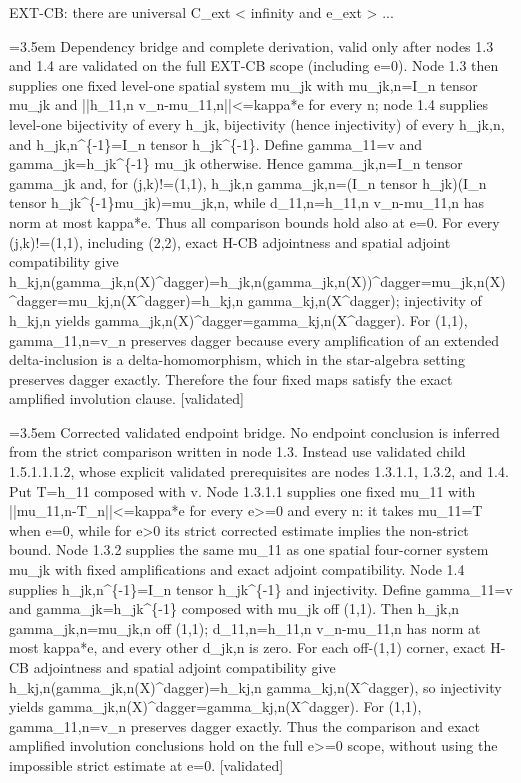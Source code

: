 \documentclass{article}
\newcommand{\step}[1]{\par\noindent\hangindent=3.5em\hangafter=1%
  \makebox[3.5em][l]{\textbf{#1.}}}
\newcommand{\steptag}[1]{\hfill{\small\textsf{[#1]}}}
\begin{document}
\begin{proofbox}{EXT-CB: there are universal C\_ext < infinity and e\_ext > ...}
\step{1.5.1.1} Dependency bridge and complete derivation, valid only after nodes 1.3 and 1.4 are validated on the full EXT-CB scope (including e=0). Node 1.3 then supplies one fixed level-one spatial system mu\_jk with mu\_jk,n=I\_n tensor mu\_jk and ||h\_11,n v\_n-mu\_11,n||<=kappa*e for every n; node 1.4 supplies level-one bijectivity of every h\_jk, bijectivity (hence injectivity) of every h\_jk,n, and h\_jk,n\textasciicircum{}\{-1\}=I\_n tensor h\_jk\textasciicircum{}\{-1\}. Define gamma\_11=v and gamma\_jk=h\_jk\textasciicircum{}\{-1\} mu\_jk otherwise. Hence gamma\_jk,n=I\_n tensor gamma\_jk and, for (j,k)!=(1,1), h\_jk,n gamma\_jk,n=(I\_n tensor h\_jk)(I\_n tensor h\_jk\textasciicircum{}\{-1\}mu\_jk)=mu\_jk,n, while d\_11,n=h\_11,n v\_n-mu\_11,n has norm at most kappa*e. Thus all comparison bounds hold also at e=0. For every (j,k)!=(1,1), including (2,2), exact H-CB adjointness and spatial adjoint compatibility give h\_kj,n(gamma\_jk,n(X)\textasciicircum{}dagger)=h\_jk,n(gamma\_jk,n(X))\textasciicircum{}dagger=mu\_jk,n(X)\textasciicircum{}dagger=mu\_kj,n(X\textasciicircum{}dagger)=h\_kj,n gamma\_kj,n(X\textasciicircum{}dagger); injectivity of h\_kj,n yields gamma\_jk,n(X)\textasciicircum{}dagger=gamma\_kj,n(X\textasciicircum{}dagger). For (1,1), gamma\_11,n=v\_n preserves dagger because every amplification of an extended delta-inclusion is a delta-homomorphism, which in the star-algebra setting preserves dagger exactly. Therefore the four fixed maps satisfy the exact amplified involution clause. \steptag{validated} \\[6pt]
\step{1.5.1.1.1} Corrected validated endpoint bridge. No endpoint conclusion is inferred from the strict comparison written in node 1.3. Instead use validated child 1.5.1.1.1.2, whose explicit validated prerequisites are nodes 1.3.1.1, 1.3.2, and 1.4. Put T=h\_11 composed with v. Node 1.3.1.1 supplies one fixed mu\_11 with ||mu\_11,n-T\_n||<=kappa*e for every e>=0 and every n: it takes mu\_11=T when e=0, while for e>0 its strict corrected estimate implies the non-strict bound. Node 1.3.2 supplies the same mu\_11 as one spatial four-corner system mu\_jk with fixed amplifications and exact adjoint compatibility. Node 1.4 supplies h\_jk,n\textasciicircum{}\{-1\}=I\_n tensor h\_jk\textasciicircum{}\{-1\} and injectivity. Define gamma\_11=v and gamma\_jk=h\_jk\textasciicircum{}\{-1\} composed with mu\_jk off (1,1). Then h\_jk,n gamma\_jk,n=mu\_jk,n off (1,1); d\_11,n=h\_11,n v\_n-mu\_11,n has norm at most kappa*e, and every other d\_jk,n is zero. For each off-(1,1) corner, exact H-CB adjointness and spatial adjoint compatibility give h\_kj,n(gamma\_jk,n(X)\textasciicircum{}dagger)=h\_kj,n gamma\_kj,n(X\textasciicircum{}dagger), so injectivity yields gamma\_jk,n(X)\textasciicircum{}dagger=gamma\_kj,n(X\textasciicircum{}dagger). For (1,1), gamma\_11,n=v\_n preserves dagger exactly. Thus the comparison and exact amplified involution conclusions hold on the full e>=0 scope, without using the impossible strict estimate at e=0. \steptag{validated} \\[6pt]

\end{proofbox}
\end{document}
